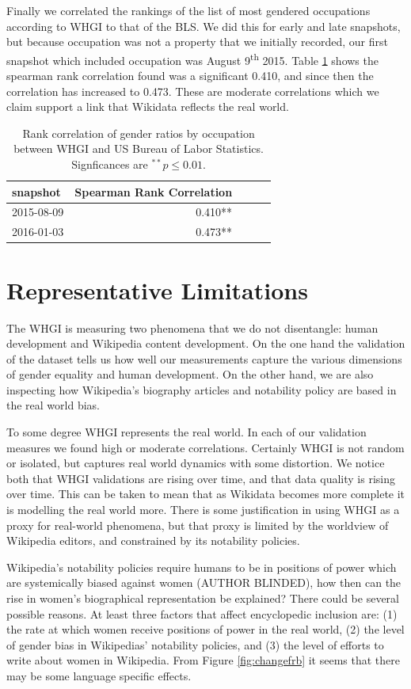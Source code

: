 \documentclass{sig-alternate-05-2015}
\begin{document}
Finally we correlated the rankings of the list of most gendered occupations according to WHGI to that of the BLS. We did this for early and late snapshots, but because occupation was not a property that we initially recorded, our first snapshot which included occupation was August 9\textsuperscript{th} 2015.  Table \ref{table:bls} shows the spearman rank correlation found was a significant 0.410, and since then the correlation has increased to 0.473. These are moderate correlations which we claim support a link that Wikidata reflects the real world.

\begin{table}
\caption{Rank correlation of gender ratios by occupation between WHGI and US
Bureau of Labor Statistics. Signficances are $ ^{**}p\leq 0.01$.}
\begin{tabular}{lrrrr}
\toprule
snapshot &  Spearman Rank Correlation \\
\midrule
2015-08-09 & 0.410**  \\
2016-01-03 & 0.473**  \\
\bottomrule
\end{tabular}
\label{table:bls}
\end{table}

\section{Representative Limitations}
The WHGI is measuring two phenomena that we do not disentangle: human development and Wikipedia content development. On the one hand the validation of the dataset tells us how well our measurements capture the various dimensions of gender equality and human development. On the other hand, we are also inspecting how Wikipedia's biography articles and notability policy are based in the real world bias.

To some degree WHGI represents the real world. In each of our validation measures we found high or moderate correlations. Certainly WHGI is not random or isolated, but captures real world dynamics with some distortion. We notice both that WHGI validations are rising over time, and that data quality is rising over time. This can be taken to mean that as Wikidata becomes more complete it is modelling the real world more. There is some justification in using WHGI as a proxy for real-world phenomena, but that proxy is limited by the worldview of Wikipedia editors, and constrained by its notability policies. 

Wikipedia's notability policies require humans to be in positions of power which are systemically biased against women (AUTHOR BLINDED), how then can the rise in women's biographical representation be explained? There could be several possible reasons. At least three factors that affect encyclopedic inclusion are: (1) the rate at which women receive positions of power in the real world, (2) the level of gender bias in Wikipedias' notability policies, and (3) the level of efforts to write about women in Wikipedia. From Figure \ref{fig:changefrb} it seems that there may be some language specific effects.
\end{document}

